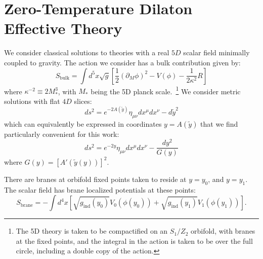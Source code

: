 \documentclass[12pt]{article}
\renewcommand{\tilde}{\widetilde} %
\begin{document}
\section{Zero-Temperature Dilaton Effective Theory}
\label{sec:zeroT}
We consider classical solutions to theories with a real $5D$ scalar field minimally coupled to gravity.  The action we consider has a bulk contribution given by:
\begin{equation}
S_\text{bulk} = \int d^5 x \sqrt{g} \left[ \frac{1}{2}\left(\partial_M \phi \right)^2 -V(\phi) - \frac{1}{2 \kappa^2} R \right]
\end{equation}
where $\kappa^{-2} \equiv 2 M_*^3$, with $M_*$ being the 5D planck scale.~\footnote{The 5D theory is taken to be compactified on an $S_1/Z_2$ orbifold, with branes at the fixed points, and the integral in the action is taken to be over the full circle, including a double copy of the action.}  We consider metric solutions with flat $4D$ slices:
\begin{equation}
ds^2 = e^{-2 A(\tilde{y})} \eta_{\mu\nu} dx^\mu dx^\nu -d\tilde{y}^2
\end{equation}
which can equivalently be expressed in coordinates $y = A (\tilde{y})$ that we find particularly convenient for this work:
\begin{equation}
ds^2 = e^{-2 y}  \eta_{\mu\nu} dx^\mu dx^\nu - \frac{dy^2}{G(y)}
\end{equation}
where $G(y)= \left[ A'(\tilde{y}(y)) \right]^2$.

There are branes at orbifold fixed points taken to reside at $y = y_0$, and $y = y_1$.  The scalar field has brane localized potentials at these points:
\begin{equation}
S_\text{brane} = -\int d^4x \left[ \sqrt{g_\text{ind} (y_0)} V_0 (\phi(y_0)) + \sqrt{g_\text{ind} (y_1)} V_1 (\phi(y_1)) \right].
\end{equation}
\end{document}

